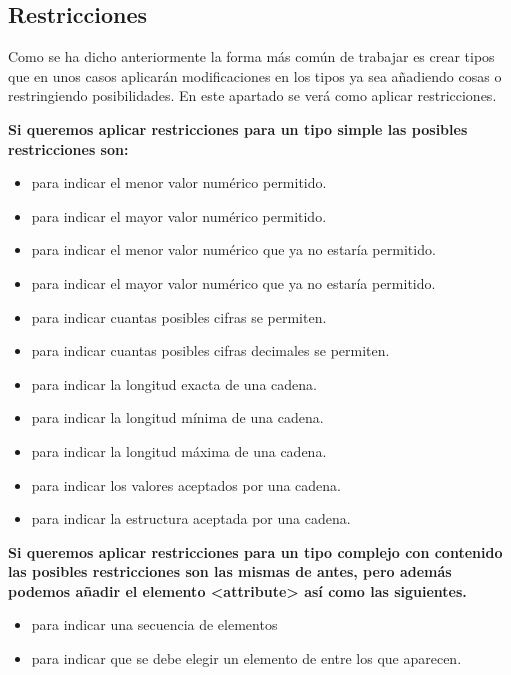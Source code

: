 \documentclass[letterpaper,10pt,spanish]{sphinxmanual}
\begin{document}
\subsection{Restricciones}
\label{tema5:restricciones}
Como se ha dicho anteriormente la forma más común de trabajar es crear tipos que en unos casos aplicarán modificaciones en los tipos ya sea añadiendo cosas o restringiendo posibilidades. En este apartado se verá como aplicar restricciones.

\textbf{Si queremos aplicar restricciones para un tipo simple las posibles restricciones son:}
\begin{itemize}
\item {} 
 para indicar el menor valor numérico permitido.

\item {} 
 para indicar el mayor valor numérico permitido.

\item {} 
 para indicar el menor valor numérico que ya no estaría permitido.

\item {} 
 para indicar el mayor valor numérico que ya no estaría permitido.

\item {} 
 para indicar cuantas posibles cifras se permiten.

\item {} 
 para indicar cuantas posibles cifras decimales se permiten.

\item {} 
 para indicar la longitud exacta de una cadena.

\item {} 
 para indicar la longitud mínima de una cadena.

\item {} 
 para indicar la longitud máxima de una cadena.

\item {} 
 para indicar los valores aceptados por una cadena.

\item {} 
 para indicar la estructura aceptada por una cadena.

\end{itemize}

\textbf{Si queremos aplicar restricciones para un tipo complejo con contenido las posibles restricciones son las mismas de antes, pero además podemos añadir el elemento \textless{}attribute\textgreater{} así como las siguientes.}
\begin{itemize}
\item {} 
 para indicar una secuencia de elementos

\item {} 
 para indicar que se debe elegir un elemento de entre los que aparecen.

\end{itemize}
\end{document}
